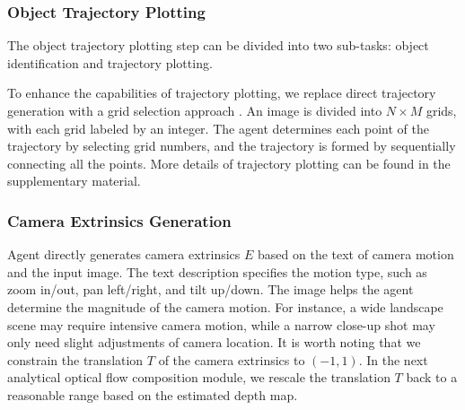 \subsubsection{Object Trajectory Plotting}
The object trajectory plotting step can be divided into two sub-tasks: object identification and trajectory plotting.



To enhance the capabilities of trajectory plotting, we replace direct trajectory generation with a grid selection approach \cite{zhang2023appagent}. An image is divided into $N \times M$ grids, with each grid labeled by an integer. The agent determines each point of the trajectory by selecting grid numbers, and the trajectory is formed by sequentially connecting all the points. More details of trajectory plotting can be found in the supplementary material.

\subsubsection{Camera Extrinsics Generation}
Agent directly generates camera extrinsics $E$ based on the text of camera motion and the input image. The text description specifies the motion type, such as zoom in/out, pan left/right, and tilt up/down. The image helps the agent determine the magnitude of the camera motion. For instance, a wide landscape scene may require intensive camera motion, while a narrow close-up shot may only need slight adjustments of camera location. It is worth noting that we constrain the translation $T$ of the camera extrinsics to $(-1, 1)$. In the next analytical optical flow composition module, we rescale the translation $T$ back to a reasonable range based on the estimated depth map.

